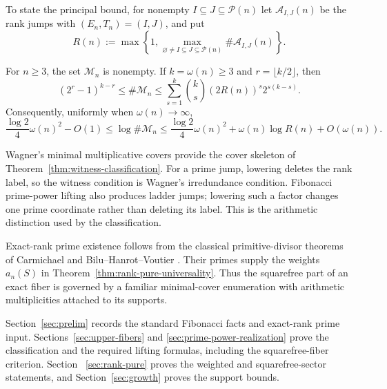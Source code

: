To state the principal bound, for nonempty $I\subseteq J\subseteq\mathcal
P(n)$ let $\mathcal A_{I,J}(n)$ be the rank jumps with
$(E_n,T_n)=(I,J)$, and put
\[
 R(n):=\max\left\{1,
 \max_{\varnothing\ne I\subseteq J\subseteq\mathcal P(n)}
 \#\mathcal A_{I,J}(n)\right\}.
\]

\begin{theorem}\label{thm:minimal-generator-growth}
For $n\geq3$, the set $\mathcal M_n$ is nonempty.  If
$k=\omega(n)\geq3$ and $r=\lfloor k/2\rfloor$, then
\begin{equation}\label{eq:private-cover-finite-bounds}
 (2^r-1)^{k-r}\leq\#\mathcal M_n
 \leq\sum_{s=1}^{k}\binom{k}{s}(2R(n))^s2^{s(k-s)}.
\end{equation}
Consequently, uniformly when $\omega(n)\to\infty$,
\begin{equation}\label{eq:private-cover-entropy-order}
 \frac{\log2}{4}\omega(n)^2-O(1)
 \leq\log\#\mathcal M_n
 \leq\frac{\log2}{4}\omega(n)^2+
 \omega(n)\log R(n)+O(\omega(n)).
\end{equation}
\end{theorem}

Wagner's minimal multiplicative covers
\cite{Wagner1978MultiplicativeCovers} provide the cover skeleton of
Theorem~\ref{thm:witness-classification}.  For a prime jump, lowering deletes
the rank label, so the witness condition is Wagner's irredundance condition.
Fibonacci prime-power lifting also produces ladder jumps; lowering such a
factor changes one prime coordinate rather than deleting its label.  This is
the arithmetic distinction used by the classification.

Exact-rank prime existence follows from the classical primitive-divisor
theorems of Carmichael and Bilu--Hanrot--Voutier
\cite{Carmichael1913PrimitiveDivisors,
BiluHanrotVoutier2001PrimitiveDivisorsLucas}.  Their primes supply the
weights $a_n(S)$ in Theorem~\ref{thm:rank-pure-universality}.  Thus the
squarefree part of an exact fiber is governed by a familiar minimal-cover
enumeration with arithmetic multiplicities attached to its supports.

Section~\ref{sec:prelim} records the standard Fibonacci facts and exact-rank
prime input.  Sections~\ref{sec:upper-fibers} and
\ref{sec:prime-power-realization} prove the classification and the required
lifting formulas, including the squarefree-fiber criterion.  Section~
\ref{sec:rank-pure} proves the weighted and squarefree-sector statements, and
Section~\ref{sec:growth} proves the support bounds.
